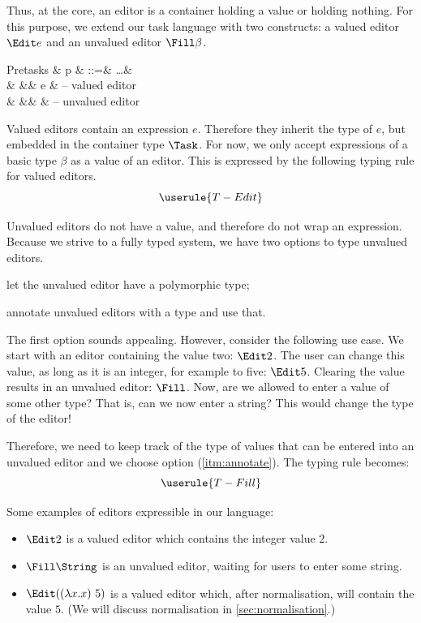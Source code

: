 Thus, at the core,
an editor is a container holding a value
or holding nothing.
For this purpose, we extend our task language with two constructs:
a valued editor $\Edit e$ and an unvalued editor $\Fill \beta$.
\begin{grammar}
  Pretasks
    & p & ::=& \ldots      & \\
    &   &\mid& \Edit e     & – valued editor \\
    &   &\mid& \Fill \beta & – unvalued editor \\
\end{grammar}

Valued editors contain an expression $e$.
Therefore they inherit the type of $e$,
but embedded in the container type $\Task$.
For now, we only accept expressions of a basic type $\beta$ as a value of an editor.
This is expressed by the following typing rule for valued editors.
\begin{equation*}
  \userule{T-Edit}
\end{equation*}

Unvalued editors do not have a value,
and therefore do not wrap an expression.
Because we strive to a fully typed system,
we have two options to type unvalued editors.
\begin{enumerate*}
  \item let the unvalued editor have a polymorphic type;
  \item annotate unvalued editors with a type and use that. \label{itm:annotate}
\end{enumerate*}

The first option sounds appealing.
However, consider the following use case.
We start with an editor containing the value two: $\Edit 2$.
The user can change this value, as long as it is an integer,
for example to five: $\Edit 5$.
Clearing the value results in an unvalued editor: $\Fill$.
Now, are we allowed to enter a value of some other type?
That is, can we now enter a string?
This would change the type of the editor!

Therefore,
we need to keep track of the type of values that can be entered into an unvalued editor
and we choose option (\ref{itm:annotate}).
The typing rule becomes:
\begin{equation*}
  \userule{T-Fill}
\end{equation*}

Some examples of editors expressible in our language:
\begin{itemize}
  \item $\Edit 2$ is a valued editor which contains the integer value $2$.
  \item $\Fill \String$ is an unvalued editor,
    waiting for users to enter some string.
  \item $\Edit ((\lambda x . x)\ 5)$ is a valued editor which,
    after normalisation, will contain the value $5$.
    (We will discuss normalisation in \autoref{sec:normalisation}.)
\end{itemize}


